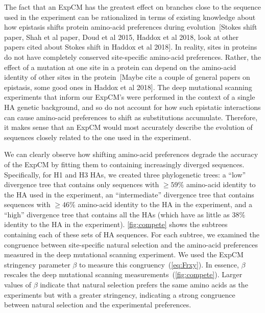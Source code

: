 \documentclass[11pt]{article}
\newcommand\jdbcomment[1]{{\color{red}[#1]}}
\begin{document}
The fact that an ExpCM has the greatest effect on branches close to the sequence used in the experiment can be rationalized in terms of existing knowledge about how epistasis shifts protein amino-acid preferences during evolution~\jdbcomment{Stokes shift paper, Shah et al paper, Doud et al 2015, Haddox et al 2018, look at other papers cited about Stokes shift in Haddox et al 2018}.
In reality, sites in proteins do not have completely conserved site-specific amino-acid preferences. 
Rather, the effect of a mutation at one site in a protein can depend on the amino-acid identity of other sites in the protein~\jdbcomment{Maybe cite a couple of general papers on epistasis, some good ones in Haddox et al 2018}. 
The deep mutational scanning experiments that inform our ExpCM's were performed in the context of a single HA genetic background, and so do not account for how such epistatic interactions can cause amino-acid preferences to shift as substitutions accumulate. 
Therefore, it makes sense that an ExpCM would most accurately describe the evolution of sequences closely related to the one used in the experiment.
 
We can clearly observe how shifting amino-acid preferences degrade the accuracy of the ExpCM by fitting them to containing increasingly diverged sequences.
Specifically, for H1 and H3 HAs, we created three phylogenetic trees: a ``low'' divergence tree that contains only sequences with $\ge 59\%$ amino-acid identity to the HA used in the experiment, an ``intermediate'' divergence tree that contains sequences with $\ge 46\%$ amino-acid identity to the HA in the experiment, and a ``high'' divergence tree that contains all the HAs (which have as little as 38\% identity to the HA in the experiment).
\ref{fig:compete} shows the subtrees containing each of these sets of HA sequences.
For each subtree, we examined the congruence between site-specific natural selection and the amino-acid preferences measured in the deep mutational scanning experiment. 
We used the ExpCM stringency parameter $\beta$ to measure this congruency~(\ref{eq:Frxy}). 
In essence, $\beta$ rescales the deep mutational scanning measurements~(\ref{fig:compete}). 
Larger values of $\beta$ indicate that natural selection prefers the same amino acids as the experiments but with a greater stringency, indicating a strong congruence between natural selection and the experimental preferences. 
\end{document}
